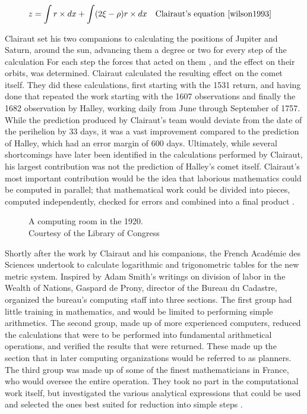 \documentclass[\rootfolder/main.tex]{subfiles}
\begin{document}
\begin{align*} \label{eqn:clairaut}
  z &= \int r \times dx + \int (2 \xi - \rho)r \times dx && \text{Clairaut's equation \cite{wilson1993}}
\end{align*}

Clairaut set his two companions to calculating the positions of Jupiter and Saturn, around the sun, advancing them a degree or two for every step of the calculation
For each step the forces that acted on them , and the effect on their orbits, was determined.
Clairaut calculated the resulting effect on the comet itself.
They did these calculations, first starting with the 1531 return, and having done that repeated the work starting with the 1607 observations and finally the 1682 observation by Halley,
working daily from June through September of 1757.
While the prediction produced by Clairaut's team would deviate from the date of the perihelion by 33 days, it was a vast improvement compared to the prediction of Halley, which had an error margin of 600 days.
Ultimately, while several shortcomings have later been identified in the calculations performed by Clairaut, his largest contribution was not the prediction of Halley's comet itself.
Clairaut's most important contribution would be the idea that laborious mathematics could be computed in parallel;
that mathematical work could be divided into pieces, computed independently, checked for errors and combined into a final product \cite{grier1955}.

\begin{wrapfigure}{R}{0.6\columnwidth}
    \caption[A computing room in the 1920s]
            {A computing room in the 1920. \\ Courtesy of the Library of Congress \label{fig:tabulatingroom}}
\end{wrapfigure}

Shortly after the work by Clairaut and his companions, the French Académie des Sciences undertook to calculate logarithmic and trigonometric tables for the new metric system.
Inspired by Adam Smith's writings on division of labor in the Wealth of Nations, Gaspard de Prony, director of the Bureau du Cadastre, organized the bureau's computing staff into three sections.
The first group had little training in mathematics, and would be limited to performing simple arithmetics.
The second group, made up of more experienced computers, reduced the calculations that were to be performed into fundamental arithmetical operations, and verified the results that were returned.
These made up the section that in later computing organizations would be referred to as planners.
The third group was made up of some of the finest mathematicians in France, who would oversee the entire operation.
They took no part in the computational work itself, but investigated the various analytical expressions that could be used and selected the ones best suited for reduction into simple steps \cite{hyman1985}.
\end{document}
